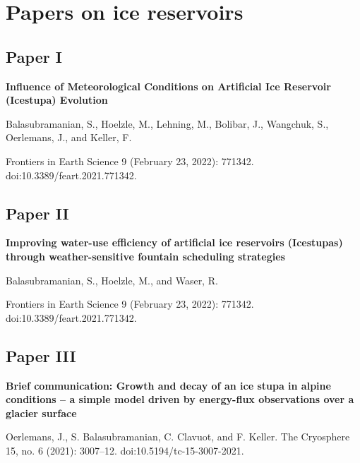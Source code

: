 \pagestyle{empty}				%
\chapter{Papers on ice reservoirs}

\section{Paper I}
\vfil\null
\huge{\textbf{Influence of Meteorological Conditions on Artificial Ice Reservoir (Icestupa) Evolution}}

\bigskip
\large{Balasubramanian, S., Hoelzle, M., Lehning, M., Bolibar, J., Wangchuk, S.,
  Oerlemans, J., and Keller, F. \par  Frontiers in Earth Science 9 (February 23, 2022): 771342.
doi:10.3389/feart.2021.771342.}



\section{Paper II}
\vfil\null
\huge{\textbf{Improving water-use efficiency of artificial ice reservoirs (Icestupas) through weather-sensitive fountain scheduling
strategies}}

\bigskip
\large{Balasubramanian, S., Hoelzle, M., and Waser, R. \par  Frontiers in Earth Science 9 (February 23, 2022): 771342. doi:10.3389/feart.2021.771342.}



\section{Paper III}
\vfil\null
\huge{\textbf{Brief communication: Growth and decay of an ice stupa in alpine conditions – a simple model driven by energy-flux observations over a glacier surface}}

\bigskip
\large{
Oerlemans, J., S. Balasubramanian, C. Clavuot, and F. Keller. The Cryosphere 15, no. 6 (2021): 3007–12. doi:10.5194/tc-15-3007-2021.
  }




